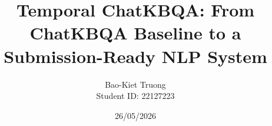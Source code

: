 \title{Temporal ChatKBQA: From ChatKBQA Baseline to a Submission-Ready NLP System}
\author{
    Bao-Kiet Truong\\[0.3cm]
    \small Student ID: 22127223
    \vspace{0.6cm}
}
\date{26/05/2026}
\logo{\large \LaTeX{}}
